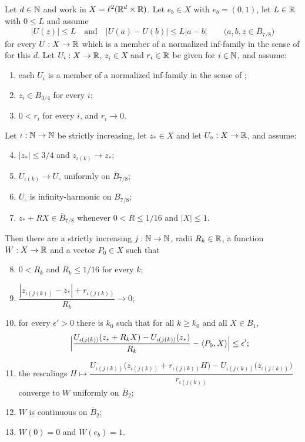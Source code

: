 \begin{lemma}
Let $d\in\mathbb{N}$ and work in $X=\ell^2(\mathbb{R}^d\times\mathbb{R})$. Let
$e_b\in X$ with $e_b=(0,1)$, let $L\in\mathbb{R}$ with $0\le L$ and assume
\begin{equation}\label{eq:ssbl-lip}
  |U(z)|\le L\quad\text{and}\quad|U(a)-U(b)|\le L|a-b|
  \qquad\bigl(a,b,z\in\overline B_{7/8}\bigr)
\end{equation}
for every $U:X\to\mathbb{R}$ which is a member of a normalized inf-family in the sense
of  for this $d$. Let
$U_i:X\to\mathbb{R}$, $z_i\in X$ and $r_i\in\mathbb{R}$ be given for $i\in\mathbb{N}$, and assume:
\begin{enumerate}
\item\label{it:ssbl-fam} each $U_i$ is a member of a normalized inf-family in
the sense of ;
\item\label{it:ssbl-ctr} $z_i\in B_{3/4}$ for every $i$;
\item\label{it:ssbl-rad} $0<r_i$ for every $i$, and $r_i\to0$.
\end{enumerate}
Let $\iota:\mathbb{N}\to\mathbb{N}$ be strictly increasing, let $z_*\in X$ and let
$U_\circ:X\to\mathbb{R}$, and assume:
\begin{enumerate}\setcounter{enumi}{3}
\item\label{it:ssbl-zs} $|z_*|\le3/4$ and $z_{\iota(k)}\to z_*$;
\item\label{it:ssbl-unif} $U_{\iota(k)}\to U_\circ$ uniformly on
$\overline B_{7/8}$;
\item\label{it:ssbl-harm} $U_\circ$ is infinity-harmonic on $B_{7/8}$;
\item\label{it:ssbl-inside} $z_*+RX\in\overline B_{7/8}$ whenever $0<R\le1/16$
and $|X|\le1$.
\end{enumerate}
Then there are a strictly increasing $j:\mathbb{N}\to\mathbb{N}$, radii $R_k\in\mathbb{R}$, a function
$W:X\to\mathbb{R}$ and a vector $P_0\in X$ such that
\begin{enumerate}\setcounter{enumi}{7}
\item\label{it:ssbl-R} $0<R_k$ and $R_k\le1/16$ for every $k$;
\item\label{it:ssbl-slow} $\dfrac{|z_{\iota(j(k))}-z_*|+r_{\iota(j(k))}}{R_k}
\longrightarrow0$;
\item\label{it:ssbl-hat} for every $\epsilon'>0$ there is $k_0$ such that for
all $k\ge k_0$ and all $X\in B_1$,
\[
  \Bigl|\frac{U_{\iota(j(k))}(z_*+R_kX)-U_{\iota(j(k))}(z_*)}{R_k}
    -\langle P_0,X\rangle\Bigr|\le\epsilon' ;
\]
\item\label{it:ssbl-W} the rescalings
$H\mapsto\dfrac{U_{\iota(j(k))}\bigl(z_{\iota(j(k))}+r_{\iota(j(k))}H\bigr)
-U_{\iota(j(k))}\bigl(z_{\iota(j(k))}\bigr)}{r_{\iota(j(k))}}$
converge to $W$ uniformly on $\overline B_2$;
\item\label{it:ssbl-Wcont} $W$ is continuous on $\overline B_2$;
\item\label{it:ssbl-Wnorm} $W(0)=0$ and $W(e_b)=1$.
\end{enumerate}
\end{lemma}
